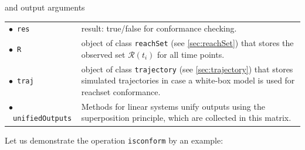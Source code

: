 and output arguments

\begin{center}
\renewcommand{\arraystretch}{1.3}
\begin{tabular}[t]{l p{13cm} }
    $\bullet$~\texttt{res} & result: true/false for conformance checking. \\
	$\bullet$~\texttt{R} & object of class \texttt{reachSet} (see \cref{sec:reachSet}) that stores the observed set $\mathcal{R}(t_i)$ for all time points. \\
	$\bullet$~\texttt{traj} & object of class \texttt{trajectory} (see \cref{sec:trajectory}) that stores simulated trajectories in case a white-box model is used for reachset conformance. \\
	$\bullet$~\texttt{unifiedOutputs} & Methods for linear systems unify outputs using the superposition principle, which are collected in this matrix.
\end{tabular}
\end{center}


Let us demonstrate the operation \texttt{isconform} by an example: 

\begin{center}
\begin{minipage}[t]{\textwidth}
	\footnotesize
	
\end{minipage}
\end{center}
